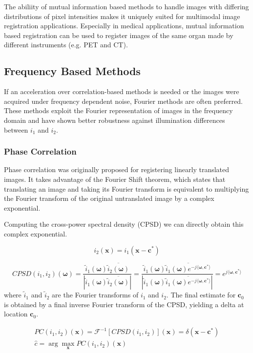 \documentclass[tocnosub,noragright,centerchapter,12pt]{uiucecethesis09}
\begin{document}
The abiliity of mutual information based methods to handle images with differing distributions of pixel intensities makes it uniquely suited for multimodal image registration applications.  Especially in medical applications, mutual information based registration can be used to register images of the same organ made by different instruments (e.g. PET and CT).

\subsection{Frequency Based Methods}

If an acceleration over correlation-based methods is needed or the images were acquired under frequency dependent noise, Fourier methods are often preferred.  These methods exploit the Fourier representation of images in the frequency domain and have shown better robustness against illumination differences between $i_1$ and $i_2$.

\subsubsection{Phase Correlation}

Phase correlation was originally proposed for registering linearly translated images.  It takes advantage of the Fourier Shift theorem, which states that translating an image and taking its Fourier transform is equivalent to multiplying the Fourier transform of the original untranslated image by a complex exponential.

Computing the cross-power spectral density (CPSD) we can directly obtain this complex exponential.

$$
i_2(\bm{x}) = i_1(\bm{x} - \bm{c}^*)
$$

$$
CPSD(i_1, i_2)(\bm{\omega}) = \frac{\tilde{i}_1(\bm{\omega}) \overline{\tilde{i}_2(\bm{\omega})}}{|\tilde{i}_1(\bm{\omega}) \overline{\tilde{i}_2(\bm{\omega})}|} =
\frac{\tilde{i}_1(\bm{\omega}) \overline{\tilde{i}_1(\bm{\omega}) e^{-j \langle \bm{\omega}, \bm{c}^* \rangle}}}{|\tilde{i}_1(\bm{\omega}) \overline{\tilde{i}_1(\bm{\omega}) e^{-j \langle \bm{\omega}, \bm{c}^* \rangle}}|} = e^{j \langle \bm{\omega},  \bm{c}^* \rangle}
$$
where $\tilde{i}_1$ and $\tilde{i}_2$ are the Fourier transforms of $i_1$ and $i_2$.  The final estimate for $\bm{c}_0$ is obtained by a final inverse Fourier transform of the CPSD, yielding a delta at location $\bm{c}_0$.

\begin{gather*}
  PC(i_1, i_2)(\bm{x}) = \mathcal{F}^{-1}\left[ CPSD(i_1, i_2) \right](\bm{x}) = \delta(\bm{x} - \bm{c}^*) \\
  \hat{c} = \arg \max_{\bm{x}} PC(i_1, i_2)(\bm{x})
\end{gather*}
\end{document}
